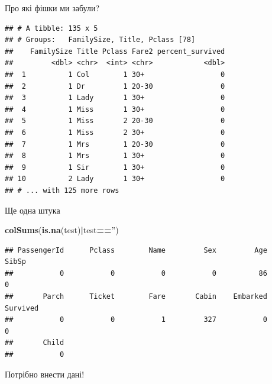 \documentclass[ignorenonframetext,]{beamer}
\newenvironment{Shaded}{\begin{snugshade}}{\end{snugshade}}
\newcommand{\DataTypeTok}[1]{\textcolor[rgb]{0.13,0.29,0.53}{#1}}
\newcommand{\DecValTok}[1]{\textcolor[rgb]{0.00,0.00,0.81}{#1}}
\newcommand{\KeywordTok}[1]{\textcolor[rgb]{0.13,0.29,0.53}{\textbf{#1}}}
\newcommand{\NormalTok}[1]{#1}
\newcommand{\OperatorTok}[1]{\textcolor[rgb]{0.81,0.36,0.00}{\textbf{#1}}}
\newcommand{\StringTok}[1]{\textcolor[rgb]{0.31,0.60,0.02}{#1}}
\begin{document}
\begin{frame}[fragile]{Про які фішки ми забули?}
\protect\hypertarget{ux43fux440ux43e-ux44fux43aux456-ux444ux456ux448ux43aux438-ux43cux438-ux437ux430ux431ux443ux43bux438}{}

\begin{Shaded}
\end{Shaded}

\begin{verbatim}
## # A tibble: 135 x 5
## # Groups:   FamilySize, Title, Pclass [78]
##    FamilySize Title Pclass Fare2 percent_survived
##         <dbl> <chr>  <int> <chr>            <dbl>
##  1          1 Col        1 30+                  0
##  2          1 Dr         1 20-30                0
##  3          1 Lady       1 30+                  0
##  4          1 Miss       1 30+                  0
##  5          1 Miss       2 20-30                0
##  6          1 Miss       2 30+                  0
##  7          1 Mrs        1 20-30                0
##  8          1 Mrs        1 30+                  0
##  9          1 Sir        1 30+                  0
## 10          2 Lady       1 30+                  0
## # ... with 125 more rows
\end{verbatim}

\end{frame}

\begin{frame}[fragile]{Ще одна штука}
\protect\hypertarget{ux449ux435-ux43eux434ux43dux430-ux448ux442ux443ux43aux430}{}

\begin{Shaded}
\begin{Highlighting}[]
\KeywordTok{colSums}\NormalTok{(}\KeywordTok{is.na}\NormalTok{(test)}\OperatorTok{|}\NormalTok{test}\OperatorTok{==}\StringTok{''}\NormalTok{)}
\end{Highlighting}
\end{Shaded}

\begin{verbatim}
## PassengerId      Pclass        Name         Sex         Age       SibSp 
##           0           0           0           0          86           0 
##       Parch      Ticket        Fare       Cabin    Embarked    Survived 
##           0           0           1         327           0           0 
##       Child 
##           0
\end{verbatim}

Потрібно внести дані!

\end{frame}
\end{document}
